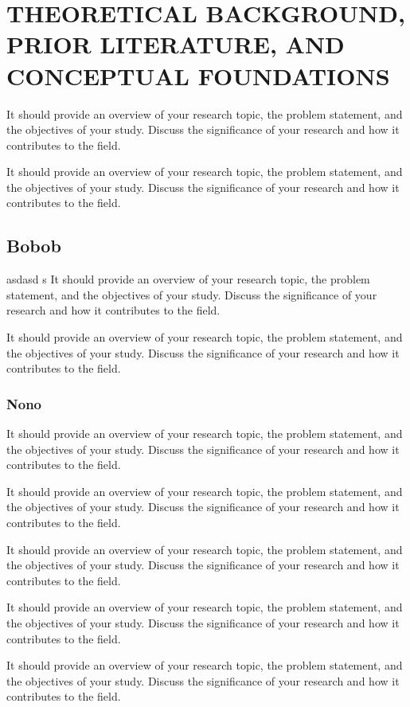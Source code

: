 \chapter{THEORETICAL BACKGROUND, PRIOR LITERATURE, AND CONCEPTUAL FOUNDATIONS}
\label{chap:background}

It should provide an overview of your research topic, the problem statement, and the objectives of your study. Discuss the significance of your research and how it contributes to the field.

It should provide an overview of your research topic, the problem statement, and the objectives of your study. Discuss the significance of your research and how it contributes to the field.


\section{Bobob}

asdasd \parencite{Lock2016} s It should provide an overview of your research topic, the problem statement, and the objectives of your study. Discuss the significance of your research and how it contributes to the field.

It should provide an overview of your research topic, the problem statement, and the objectives of your study. Discuss the significance of your research and how it contributes to the field.


\subsection{Nono}

It should provide an overview of your research topic, the problem statement, and the objectives of your study. Discuss the significance of your research and how it contributes to the field.

It should provide an overview of your research topic, the problem statement, and the objectives of your study. Discuss the significance of your research and how it contributes to the field.

It should provide an overview of your research topic, the problem statement, and the objectives of your study. Discuss the significance of your research and how it contributes to the field.

It should provide an overview of your research topic, the problem statement, and the objectives of your study. Discuss the significance of your research and how it contributes to the field.

It should provide an overview of your research topic, the problem statement, and the objectives of your study. Discuss the significance of your research and how it contributes to the field.

